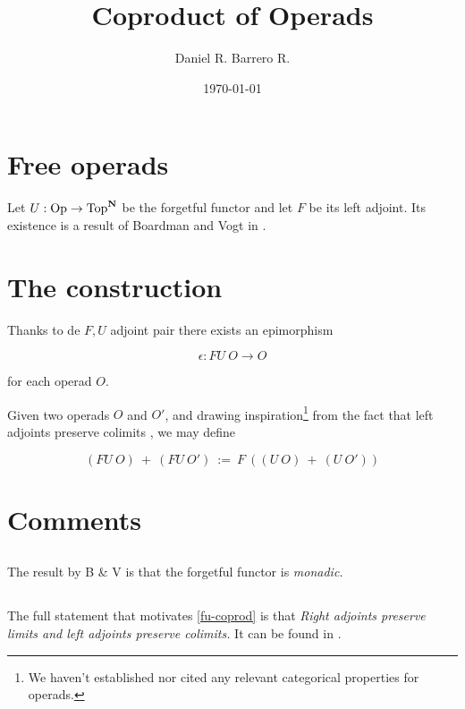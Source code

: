 \documentclass{amsart}
\title{Coproduct of Operads}
\author{Daniel R. Barrero R.}
\date{\today}
\begin{document}
\maketitle

\section{Free operads}

Let $U : \mathrm{Op} \to \mathrm{Top}^{\mathbf{N}}$ be the forgetful functor and let $F$ be its
left adjoint. Its existence is a result of Boardman and Vogt in \cite{bv-hiasots}.

\section{The construction}

Thanks to de $F,U$ adjoint pair there exists an epimorphism

\begin{equation}\label{fu-epi}
	\epsilon : FU \ O \to O
\end{equation}


for each operad $O$.

Given two operads $O$ and $O'$, and drawing inspiration\footnote{We haven't established nor cited
any relevant categorical properties for operads.} from the fact that left adjoints
preserve colimits \cite{riehl-ctic}, we may define

\begin{equation}\label{fu-coprod}
	(FU \ O) \ + \ (FU \ O') \ := \ F \ \left( (U \ O) \ + \ (U \ O') \right)
\end{equation}

\section{Comments}

\subsection{} The result by B \& V is that the forgetful functor is \emph{monadic.}

\subsection{} The full statement that motivates \eqref{fu-coprod} is that
\emph{Right adjoints preserve limits and left adjoints preserve colimits.} It can be found
in \cite{riehl-ctic}.



\end{document}
